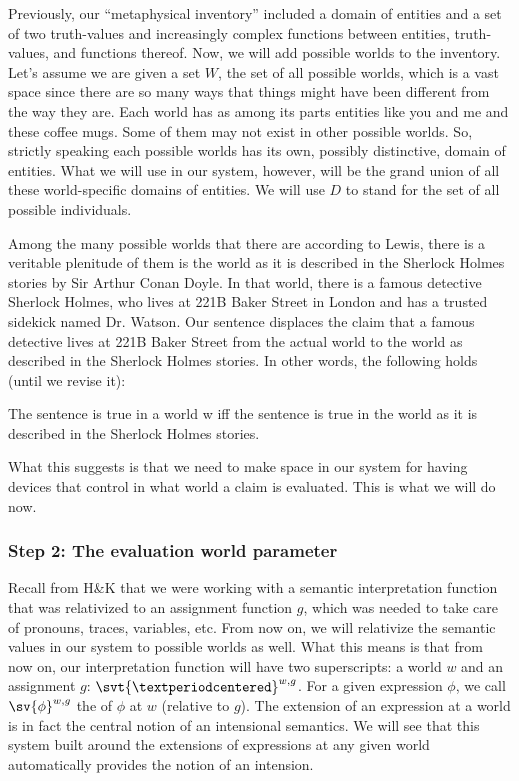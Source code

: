 Previously, our ``metaphysical inventory'' included a domain of entities and a
set of two truth-values and increasingly complex functions between entities,
truth-values, and functions thereof. Now, we will add possible worlds to the
inventory. Let's assume we are given a set $W$, the set of all possible worlds,
which is a vast space since there are so many ways that things might have been
different from the way they are. Each world has as among its parts entities like
you and me and these coffee mugs. Some of them may not exist in other possible
worlds. So, strictly speaking each possible worlds has its own, possibly
distinctive, domain of entities. What we will use in our system, however, will
be the grand union of all these world-specific domains of entities. We will use
$D$ to stand for the set of all possible individuals.

Among the many possible worlds that there are \dash according to Lewis, there is
a veritable plenitude of them \dash is the world as it is described in the
Sherlock Holmes stories by Sir Arthur Conan Doyle. In that world, there is a
famous detective Sherlock Holmes, who lives at 221B Baker Street in London and
has a trusted sidekick named Dr. Watson. Our sentence  displaces the
claim that a famous detective lives at 221B Baker Street from the actual world
to the world as described in the Sherlock Holmes stories. In other words, the
following holds (until we revise it):

\ex The sentence  is true in a world w iff the sentence  is true in the world as it is described
in the Sherlock Holmes stories. \xe

What this suggests is that we need to make space in our system for having
devices that control in what world a claim is evaluated. This is what we will do
now.

\subsubsection{Step 2: The evaluation world parameter}
\label{sec:eval-world-param}

Recall from H\&K that we were working with a semantic interpretation function
that was relativized to an assignment function $g$, which was needed to take
care of pronouns, traces, variables, etc. From now on, we will relativize the
semantic values in our system to possible worlds as well. What this means is
that from now on, our interpretation function will have two superscripts: a
world $w$ and an assignment $g$: $\svt{\textperiodcentered}^{w,g}$. For a given
expression $\phi$, we call $\sv{\phi}^{w,g}$ the  of $\phi$ at
$w$ (relative to $g$). The extension of an expression at a world is in fact the
central notion of an intensional semantics. We will see that this system built
around the extensions of expressions at any given world automatically provides
the notion of an intension.

